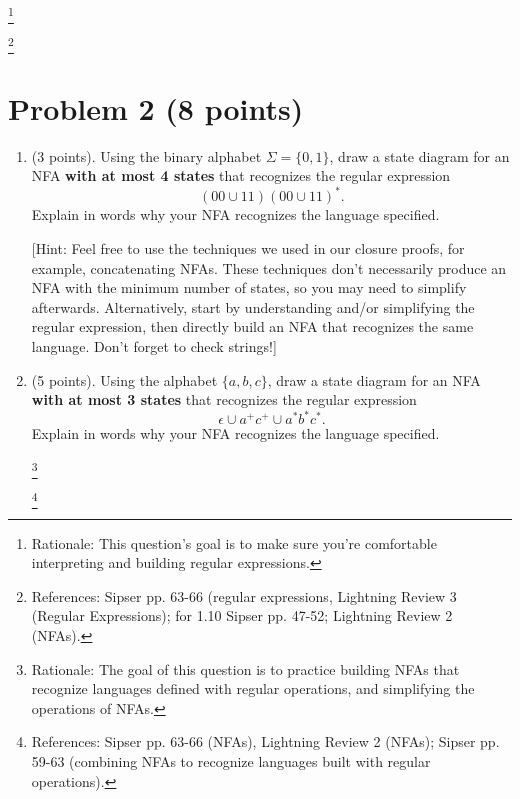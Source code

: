 \documentclass[letterpaper,11pt,twoside]{article}
\theoremstyle{plain}
\theoremstyle{definition}
\theoremstyle{remark}
\theoremstyle{restate}
\newcommand\blfootnote[1]{%
  \begingroup
  \renewcommand\thefootnote{}\footnote{#1}%
  \addtocounter{footnote}{-1}%
  \endgroup
}
\begin{document}
\blfootnote{ Rationale: This question's goal is to make sure you're comfortable interpreting and building regular expressions. }
\blfootnote{ References: Sipser pp. 63-66 (regular expressions, Lightning Review 3 (Regular Expressions); for 1.10 Sipser pp. 47-52; Lightning Review 2 (NFAs).}




\clearpage
\section*{Problem 2 (8 points)}

\begin{enumerate}
    \item (3 points). Using the binary alphabet $\Sigma = \{0, 1\}$, draw a state diagram for an NFA \textbf{with at most 4 states} that recognizes the regular expression
    \[
            (00 \cup 11)(00 \cup 11)^*.
    \]
    Explain in words why your NFA recognizes the language specified.
        
    [Hint: Feel free to use the techniques we used in our closure proofs, for example, concatenating NFAs. These techniques don't necessarily produce an NFA with the minimum number of states, so you may need to simplify afterwards. Alternatively, start by understanding and/or simplifying the regular expression, then directly build an NFA that recognizes the same language. Don't forget to check strings!]

    \item (5 points). Using the alphabet $\{a, b, c\}$, draw a state diagram for an NFA \textbf{with at most 3 states} that recognizes the regular expression
    \[
        \epsilon \cup a^+c^+ \cup a^*b^*c^*.
    \]
    Explain in words why your NFA recognizes the language specified.

    \blfootnote{ Rationale: The goal of this question is to practice building NFAs that recognize languages defined with regular operations, and simplifying the operations of NFAs. }
    \blfootnote{ References: Sipser pp. 63-66 (NFAs), Lightning Review 2 (NFAs); Sipser pp. 59-63 (combining NFAs to recognize languages built with regular operations). }

    
\end{enumerate}

\clearpage
\end{document}
